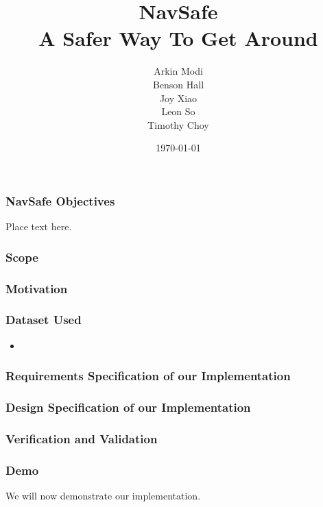 \documentclass[t,12pt,numbers,fleqn]{beamer}
\title{
    NavSafe\\
    \large A Safer Way To Get Around
}
\author{
    Arkin Modi\\
    Benson Hall\\
    Joy Xiao\\
    Leon So\\
    Timothy Choy
}
\institute{Department of Software and Computing, McMaster University}
\date{\today}
\begin{document}
 
\frame{\titlepage}


\begin{frame}
\frametitle{NavSafe Objectives}
Place text here.
\end{frame}
 
\begin{frame}
\frametitle{Scope}

\end{frame}
\begin{frame}
\frametitle{Motivation}

\end{frame}
\begin{frame}
\frametitle{Dataset Used}
\begin{itemize}
    \item 
\end{itemize}
\end{frame}
\begin{frame}
\frametitle{Requirements Specification of our Implementation}

\end{frame}
\begin{frame}
\frametitle{Design Specification of our Implementation}
    
\end{frame}
\begin{frame}
\frametitle{Verification and Validation}

\end{frame}
\begin{frame}
\frametitle{Demo}
We will now demonstrate our implementation.
\end{frame}
\end{document}
